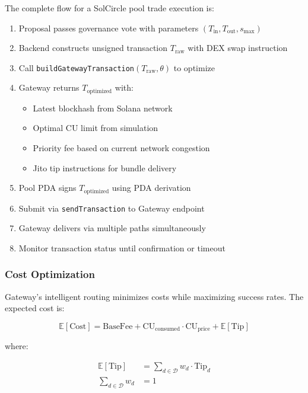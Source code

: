 \documentclass[11pt,a4paper]{article}
\begin{document}
The complete flow for a SolCircle pool trade execution is:

\begin{enumerate}
\item Proposal passes governance vote with parameters $(T_{\text{in}}, T_{\text{out}}, s_{\text{max}})$
\item Backend constructs unsigned transaction $T_{\text{raw}}$ with DEX swap instruction
\item Call \texttt{buildGatewayTransaction}$(T_{\text{raw}}, \theta)$ to optimize
\item Gateway returns $T_{\text{optimized}}$ with:
\begin{itemize}
\item Latest blockhash from Solana network
\item Optimal CU limit from simulation
\item Priority fee based on current network congestion
\item Jito tip instructions for bundle delivery
\end{itemize}
\item Pool PDA signs $T_{\text{optimized}}$ using PDA derivation
\item Submit via \texttt{sendTransaction} to Gateway endpoint
\item Gateway delivers via multiple paths simultaneously
\item Monitor transaction status until confirmation or timeout
\end{enumerate}

\subsubsection{Cost Optimization}

Gateway's intelligent routing minimizes costs while maximizing success rates. The expected cost is:

\begin{equation}
\mathbb{E}[\text{Cost}] = \text{BaseFee} + \text{CU}_{\text{consumed}} \cdot \text{CU}_{\text{price}} + \mathbb{E}[\text{Tip}]
\end{equation}

where:

\begin{align}
\mathbb{E}[\text{Tip}] &= \sum_{d \in \mathcal{D}} w_d \cdot \text{Tip}_d \\
\sum_{d \in \mathcal{D}} w_d &= 1
\end{align}
\end{document}
